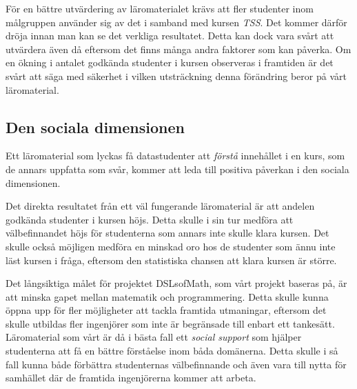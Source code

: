 \documentclass[12pt,a4paper,twoside,openright]{article}
\begin{document}
För en bättre utvärdering av läromaterialet krävs att fler studenter
inom målgruppen använder sig av det i samband med kursen
\textit{TSS}. Det kommer därför dröja innan man kan se det verkliga
resultatet. Detta kan dock vara svårt att utvärdera även då eftersom
det finns många andra faktorer som kan påverka. Om en ökning i antalet
godkända studenter i kursen observeras i framtiden är det svårt att
säga med säkerhet i vilken utsträckning denna förändring beror på vårt
läromaterial.


\subsection{Den sociala dimensionen}

Ett läromaterial som lyckas få datastudenter att \emph{förstå}
innehållet i en kurs, som de annars uppfatta som svår, kommer att leda
till positiva påverkan i den sociala
dimensionen. %

Det direkta resultatet från ett väl fungerande läromaterial är att
andelen godkända studenter i kursen höjs. Detta skulle i sin tur
medföra att välbefinnandet höjs för studenterna som annars inte skulle
klara kursen. Det skulle också möjligen medföra en minskad oro hos de
studenter som ännu inte läst kursen i fråga, eftersom den statistiska
chansen att klara kursen är större.

Det långsiktiga målet för projektet DSLsofMath, som vårt projekt
baseras på, är att minska gapet mellan matematik och
programmering. %
Detta skulle kunna öppna upp för fler möjligheter att tackla framtida
utmaningar, eftersom det skulle utbildas fler ingenjörer som inte är
begränsade till enbart ett tankesätt.
Läromaterial som vårt  är då i bästa fall ett \emph{social support}
som hjälper studenterna att få en bättre förståelse inom båda domänerna. Detta
skulle i så fall kunna både förbättra studenternas välbefinnande och
även vara till nytta för samhället där de framtida ingenjörerna
kommer att arbeta.
\end{document}
